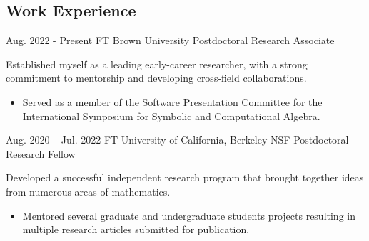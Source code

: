 \documentclass[
	10pt, %
]{FreemanCV}
\begin{document}
\begin{paracol}{2}

\medskip %


\section{Work Experience}





\jobentry
	{Aug. 2022 - Present} %
	{FT} %
	{Brown University} %
	{Postdoctoral Research Associate} %
	{Established myself as a leading early-career researcher, with a strong commitment to mentorship and developing cross-field collaborations. 
	\begin{itemize}[leftmargin=*]
	\item Served as a member of the Software Presentation Committee for the International Symposium for Symbolic and Computational Algebra.
	\end{itemize}
	} %


\jobentry
	{Aug. 2020 -- Jul. 2022} %
	{FT} %
	{University of California, Berkeley} %
	{NSF Postdoctoral Research Fellow} %
	{Developed a successful independent research program that brought together ideas from numerous areas of mathematics.
	\begin{itemize}[leftmargin=*]
	\item Mentored several graduate and undergraduate students projects resulting in multiple research articles submitted for publication.  
	\end{itemize}
	  } %


\end{paracol}
\end{document}

